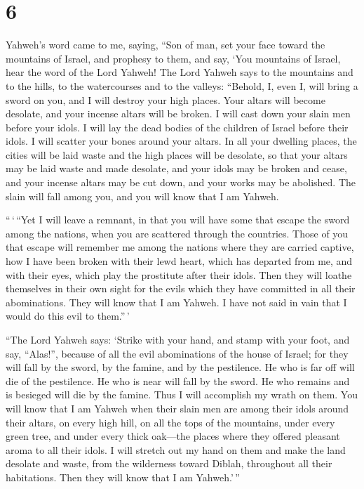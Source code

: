 \hypertarget{section-5}{%
\section{6}\label{section-5}}

 Yahweh's word came to me, saying,  ``Son of
man, set your face toward the mountains of Israel, and prophesy to them,
 and say, `You mountains of Israel, hear the word of the
Lord Yahweh! The Lord Yahweh says to the mountains and to the hills, to
the watercourses and to the valleys: ``Behold, I, even I, will bring a
sword on you, and I will destroy your high places.  Your
altars will become desolate, and your incense altars will be broken. I
will cast down your slain men before your idols.  I will
lay the dead bodies of the children of Israel before their idols. I will
scatter your bones around your altars.  In all your
dwelling places, the cities will be laid waste and the high places will
be desolate, so that your altars may be laid waste and made desolate,
and your idols may be broken and cease, and your incense altars may be
cut down, and your works may be abolished.  The slain will
fall among you, and you will know that I am Yahweh.

 ``\,`\,``Yet I will leave a remnant, in that you will
have some that escape the sword among the nations, when you are
scattered through the countries.  Those of you that escape
will remember me among the nations where they are carried captive, how I
have been broken with their lewd heart, which has departed from me, and
with their eyes, which play the prostitute after their idols. Then they
will loathe themselves in their own sight for the evils which they have
committed in all their abominations.  They will know that
I am Yahweh. I have not said in vain that I would do this evil to
them.''\,'

 ``The Lord Yahweh says: `Strike with your hand, and
stamp with your foot, and say, ``Alas!'', because of all the evil
abominations of the house of Israel; for they will fall by the sword, by
the famine, and by the pestilence.  He who is far off
will die of the pestilence. He who is near will fall by the sword. He
who remains and is besieged will die by the famine. Thus I will
accomplish my wrath on them.  You will know that I am
Yahweh when their slain men are among their idols around their altars,
on every high hill, on all the tops of the mountains, under every green
tree, and under every thick oak---the places where they offered pleasant
aroma to all their idols.  I will stretch out my hand on
them and make the land desolate and waste, from the wilderness toward
Diblah, throughout all their habitations. Then they will know that I am
Yahweh.'\,''

